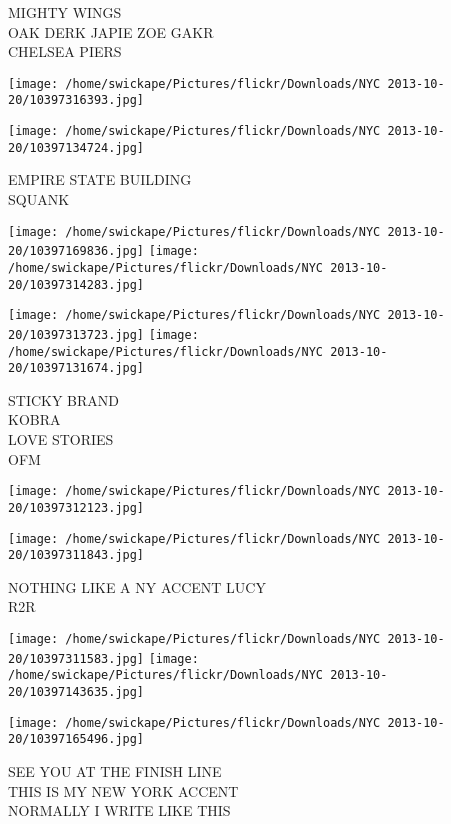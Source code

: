 \documentclass[10pt,letterpaper]{article}
\begin{document}
MIGHTY WINGS\\
OAK DERK JAPIE ZOE GAKR\\
CHELSEA PIERS\\
\pagebreak

\texttt{[image: /home/swickape/Pictures/flickr/Downloads/NYC 2013-10-20/10397316393.jpg]}

\vspace{0.25in}
\texttt{[image: /home/swickape/Pictures/flickr/Downloads/NYC 2013-10-20/10397134724.jpg]}

EMPIRE STATE BUILDING\\
SQUANK\\
\pagebreak

\texttt{[image: /home/swickape/Pictures/flickr/Downloads/NYC 2013-10-20/10397169836.jpg]}
\texttt{[image: /home/swickape/Pictures/flickr/Downloads/NYC 2013-10-20/10397314283.jpg]}

\texttt{[image: /home/swickape/Pictures/flickr/Downloads/NYC 2013-10-20/10397313723.jpg]}
\texttt{[image: /home/swickape/Pictures/flickr/Downloads/NYC 2013-10-20/10397131674.jpg]}

STICKY BRAND\\
KOBRA\\
LOVE STORIES\\
OFM\\
\pagebreak

\texttt{[image: /home/swickape/Pictures/flickr/Downloads/NYC 2013-10-20/10397312123.jpg]}

\vspace{0.25in}
\texttt{[image: /home/swickape/Pictures/flickr/Downloads/NYC 2013-10-20/10397311843.jpg]}

NOTHING LIKE A NY ACCENT LUCY\\
R2R\\
\pagebreak

\texttt{[image: /home/swickape/Pictures/flickr/Downloads/NYC 2013-10-20/10397311583.jpg]}
\texttt{[image: /home/swickape/Pictures/flickr/Downloads/NYC 2013-10-20/10397143635.jpg]}

\vspace{0.25in}
\texttt{[image: /home/swickape/Pictures/flickr/Downloads/NYC 2013-10-20/10397165496.jpg]}

SEE YOU AT THE FINISH LINE\\
THIS IS MY NEW YORK ACCENT\\
NORMALLY I WRITE LIKE THIS\\
\pagebreak
\end{document}
